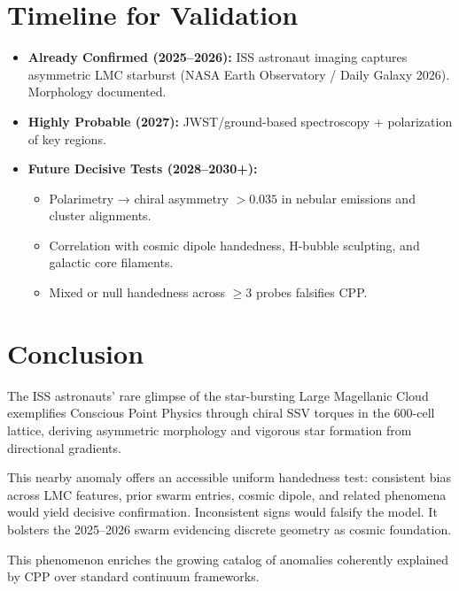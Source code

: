 \documentclass[11pt]{article}
\begin{document}
\section{Timeline for Validation}
\begin{itemize}
    \item \textbf{Already Confirmed (2025--2026):} ISS astronaut imaging captures asymmetric LMC starburst (NASA Earth Observatory / Daily Galaxy 2026). Morphology documented.
    \item \textbf{Highly Probable (2027):} JWST/ground-based spectroscopy + polarization of key regions.
    \item \textbf{Future Decisive Tests (2028--2030+):}
    \begin{itemize}
        \item Polarimetry → chiral asymmetry $>0.035$ in nebular emissions and cluster alignments.
        \item Correlation with cosmic dipole handedness, H-bubble sculpting, and galactic core filaments.
        \item Mixed or null handedness across $\geq 3$ probes falsifies CPP.
    \end{itemize}
\end{itemize}

\section{Conclusion}
The ISS astronauts' rare glimpse of the star-bursting Large Magellanic Cloud exemplifies Conscious Point Physics through chiral SSV torques in the 600-cell lattice, deriving asymmetric morphology and vigorous star formation from directional gradients.  

This nearby anomaly offers an accessible uniform handedness test: consistent bias across LMC features, prior swarm entries, cosmic dipole, and related phenomena would yield decisive confirmation. Inconsistent signs would falsify the model. It bolsters the 2025--2026 swarm evidencing discrete geometry as cosmic foundation.  

This phenomenon enriches the growing catalog of anomalies coherently explained by CPP over standard continuum frameworks.
\end{document}
